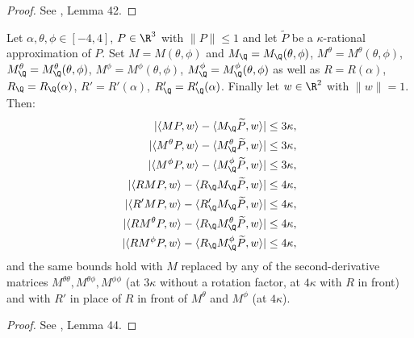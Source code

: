 \begin{proof}
\leanok
See \cite{polyhedron.without.rupert}, Lemma 42.
\end{proof}


\begin{lemma} \label{lem:boundskappa}
\leanok
{}
    Let $\alpha, \theta, \phi \in [-4,4]$, $P\in \R^3$ with $\|P\| \leq 1$ and let $\widetilde{P}$ be a $\kappa$-rational approximation of $P$. Set $M = M(\theta, \phi)$ and $M_{\Q} = M_{\Q}(\theta, \phi)$, $M^\theta = M^\theta(\theta, \phi)$, $M^\theta_{\Q} = M^\theta_{\Q}(\theta, \phi)$, $M^\phi = M^\phi(\theta, \phi)$, $M^\phi_{\Q} = M^\phi_{\Q}(\theta, \phi)$ as well as $R = R(\alpha)$, $R_{\Q} = R_{\Q}(\alpha)$, $R' = R'(\alpha)$, $R'_{\Q} = R'_{\Q}(\alpha)$. Finally let $w \in \R^2$ with $\|w\| = 1$. Then:
    \begin{align}
        | \langle M P, w\rangle - \langle M_{\Q} \widetilde{P}, w\rangle | & \leq 3\kappa, \label{eq:boundskappa1} \\
        | \langle M^\theta P, w\rangle - \langle M^\theta_{\Q} \widetilde{P}, w\rangle | & \leq 3\kappa,\\
        | \langle M^\phi P, w\rangle - \langle M^\phi_{\Q} \widetilde{P}, w\rangle | & \leq 3\kappa,\\
        | \langle R M P, w\rangle - \langle R_{\Q} M_{\Q} \widetilde{P}, w\rangle | & \leq 4\kappa,\label{eq:boundskappa4} \\
        | \langle R' M P, w\rangle - \langle R'_{\Q} M_{\Q} \widetilde{P}, w\rangle | & \leq 4\kappa,\\
        | \langle R M^\theta P, w\rangle - \langle R_{\Q} M^\theta_{\Q} \widetilde{P}, w\rangle | & \leq 4\kappa,\\
        | \langle R M^\phi P, w\rangle - \langle R_{\Q} M^\phi_{\Q} \widetilde{P}, w\rangle | & \leq 4\kappa,
    \end{align}
    and the same bounds hold with $M$ replaced by any of the second-derivative
    matrices $M^{\theta\theta}, M^{\theta\phi}, M^{\phi\phi}$ (at $3\kappa$
    without a rotation factor, at $4\kappa$ with $R$ in front) and with $R'$ in
    place of $R$ in front of $M^\theta$ and $M^\phi$ (at $4\kappa$).
\end{lemma}
\begin{proof}
\leanok
{}
See \cite{polyhedron.without.rupert}, Lemma 44.
\end{proof}


